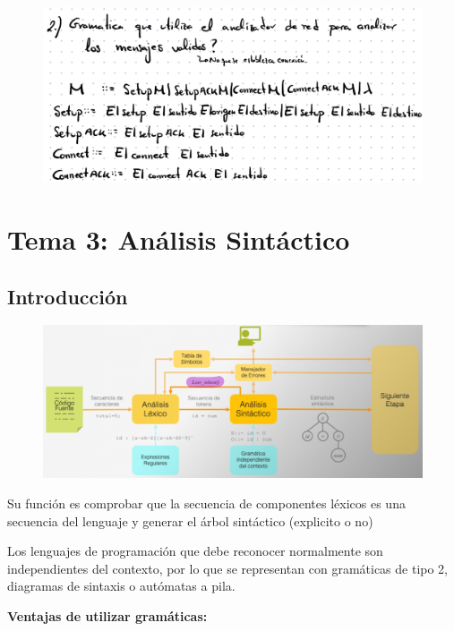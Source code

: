 \documentclass[12pt]{report} %
\begin{document}
\begin{figure}[H]
	{\includegraphics[scale=.3]{image-20210305192731385.png}}
\end{figure}

\chapter{Tema 3: Análisis Sintáctico}


\section{Introducción}

\begin{figure}[H]
	{\includegraphics[scale=.3]{image-20210312115053541.png}}
\end{figure}

Su función es comprobar que la secuencia de componentes léxicos es una
secuencia del lenguaje y generar el árbol sintáctico (explicito o no)

Los lenguajes de programación que debe reconocer normalmente son
independientes del contexto, por lo que se representan con gramáticas de
tipo 2, diagramas de sintaxis o autómatas a pila.

\textbf{Ventajas de utilizar gramáticas:}
\end{document}
